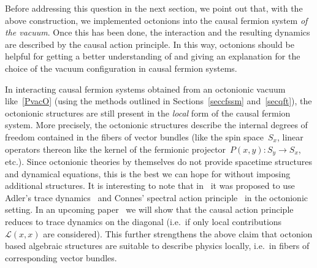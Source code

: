 \documentclass[reqno,11pt]{amsart}
\numberwithin{equation}{section}
\newcommand{\1}{\mbox{\rm 1 \hspace{-1.05 em} 1}}
\renewcommand{\L}{{\mathcal{L}}}
\begin{document}
Before addressing this question in the next section, we point out that, with the above construction,
we implemented octonions into the causal fermion system {\em{of the vacuum}}.
Once this has been done, the interaction and the resulting dynamics are described by the
causal action principle. In this way, octonions should be helpful for getting a better understanding of
and giving an explanation for the choice of the vacuum configuration in causal fermion systems.

In interacting causal fermion systems obtained from an octonionic vacuum like~\eqref{PvacO}
(using the methods outlined in Sections~\ref{seccfssm} and~\ref{secqft}), the octonionic structures are still 
present in the {\em{local}} form of the causal fermion system.
More precisely, the octonionic structures describe the internal degrees of freedom contained in
the fibers of vector bundles (like the spin space~$S_x$, linear operators thereon 
like the kernel of the fermionic projector~$P(x,y) : S_y \rightarrow S_x$, etc.).
Since octonionic theories by themselves do not provide spacetime structures and dynamical equations,
this is the best we can hope for without imposing additional structures.
It is interesting to note that in~\cite{singh-octo2, singh-td} it was proposed to use Adler's trace dynamics~\cite{adler-trace} and Connes' spectral action principle~\cite{connes}
in the octonionic setting. In an upcoming paper~\cite{tracedynamics} we will show that the causal action principle reduces to trace dynamics on the diagonal (i.e.\ if only local contributions~$\L(x,x)$ are considered). This further strengthens the above claim that octonion based algebraic structures are suitable to describe physics locally,
i.e.\ in fibers of corresponding vector bundles.
\end{document}
